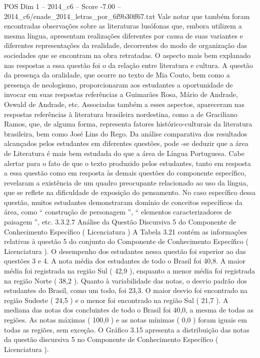 \begin{textsample}{POS Dim 1 – 2014\_c6 – Score -7.00 – 2014\_c6/enade\_2014\_letras\_por\_6f9b30ff67.txt}
Vale notar que também foram encontradas observações sobre as literaturas lusófonas que, embora utilizem a mesma língua, apresentam realizações diferentes por causa de suas variantes e diferentes representações da realidade, decorrentes do modo de organização das sociedades que se encontram na obra retratadas.
O aspecto mais bem explanado nas respostas a essa questão foi o da relação entre literatura e cultura.
A questão da presença da oralidade, que ocorre no texto de Mia Couto, bem como a presença de neologismo, proporcionaram aos estudantes a oportunidade de invocar em suas respostas referências a Guimarães Rosa, Mário de Andrade, Oswald de Andrade, etc.
Associadas também a esses aspectos, apareceram nas respostas referências à literatura brasileira nordestina, como a de Graciliano Ramos, que, de alguma forma, representa fatores histórico-culturais da literatura brasileira, bem como José Lins do Rego.
Da análise comparativa dos resultados alcançados pelos estudantes em diferentes questões, pode -se deduzir que a área de Literatura é mais bem estudada do que a área de Língua Portuguesa.
Cabe alertar para o fato de que o texto produzido pelos estudantes, tanto em resposta a essa questão como em resposta às demais questões do componente específico, revelaram a existência de um quadro preocupante relacionado ao uso da língua, que se reflete na dificuldade de exposição do pensamento.
No caso específico dessa questão, muitos estudantes demonstraram domínio de conceitos específicos da área, como “ construção de personagem ”, “ elementos caracterizadores de paisagem ”, etc. 3.3.2.7 Análise da Questão Discursiva 5 do Componente de Conhecimento Específico ( Licenciatura ) A Tabela 3.21 contém as informações relativas à questão 5 do conjunto do Componente de Conhecimento Específico ( Licenciatura ).
O desempenho dos estudantes nessa questão foi superior ao das questões 3 e 4.
A nota média dos estudantes de todo o Brasil foi 40,8.
A maior média foi registrada na região Sul ( 42,9 ), enquanto a menor média foi registrada na região Norte ( 38,2 ).
Quanto à variabilidade das notas, o desvio padrão dos estudantes do Brasil, como um todo, foi 23,3.
O maior desvio foi encontrado na região Sudeste ( 24,5 ) e o menor foi encontrado na região Sul ( 21,7 ).
A mediana das notas dos concluintes de todo o Brasil foi 40,0, a mesma de todas as regiões.
As notas máximas ( 100,0 ) e as notas mínimas ( 0,0 ) foram iguais em todas as regiões, sem exceção.
O Gráfico 3.15 apresenta a distribuição das notas da questão discursiva 5 no Componente de Conhecimento Específico ( Licenciatura ).

\end{textsample}
